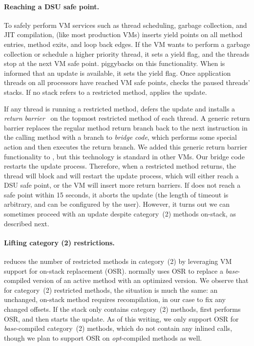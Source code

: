 \paragraph{Reaching a DSU safe point.}
To safely perform VM services such as thread scheduling, garbage
collection, and JIT compilation, \JikesRVM{} (like most production
VMs) inserts yield points on all method entries, method exits, and
loop back edges.  If the VM wants to perform a garbage collection or
schedule a higher priority thread, it sets a yield flag, and the
threads stop at the next VM safe point.  
\DSU{} piggybacks on this functionality.  When \DSU{} is informed that an
update is available, it sets the yield flag.  Once application threads
on all processors have reached VM safe points, \DSU{} checks the
paused threads' stacks.  If no stack refers to a restricted
method, \DSU{} applies the update.  

If any thread is running a restricted
method, \DSU{} defers the update and installs a \emph{return
  barrier}~\cite{return-barrier} on the topmost restricted method of each thread.  
A generic return barrier replaces the regular method return branch
back to the next instruction in the calling method with a branch to
\emph{bridge code}, which performs some special action and then
executes the return branch.  We added this generic return barrier
functionality to \JikesRVM\@, but this technology is standard in other
VMs.  Our bridge code restarts the update process.
Therefore, when a restricted method returns,
the thread will block and \DSU{} will restart the update process, which will
either reach a DSU safe 
point, or the VM will insert more return barriers.  If \DSU{} does not reach a safe
point within 15 seconds, it aborts the update (the
length of timeout is arbitrary, and can be configured by the user).
However, it turns out we can sometimes proceed with an update despite
category~(2) methods on-stack, as described next.

\paragraph{Lifting category (2) restrictions.} 
\DSU{} reduces the number of restricted methods in category~(2) by leveraging
VM support for on-stack replacement (OSR).  \JikesRVM{} normally uses OSR to
replace a \emph{base}-compiled version of an active method with an
optimized version.  We observe that for category~(2) restricted
methods, the situation is much the same: an unchanged, on-stack method
requires recompilation, in our case to fix any changed offsets. If the stack only contains category~(2) methods, \DSU{} first performs OSR, and then starts the update.
As of this writing, we only support OSR for \emph{base}-compiled category~(2) methods,
which do not contain any inlined calls, though we plan to support OSR
on \emph{opt}-compiled methods as well.

